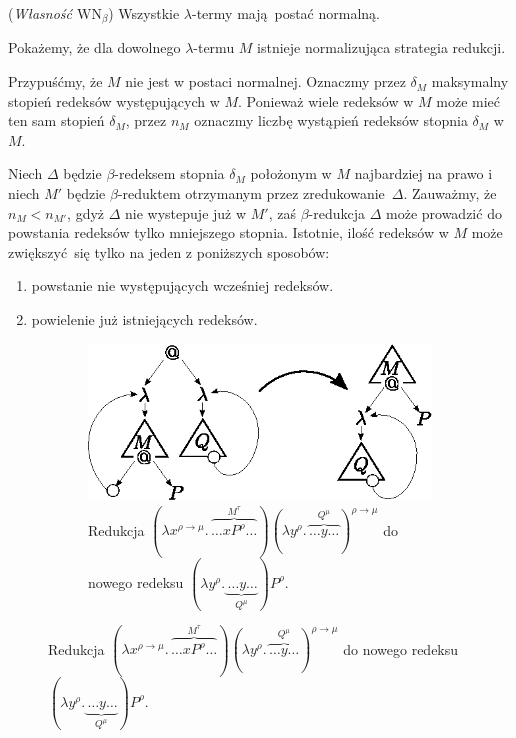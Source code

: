 \begin{twierdzenie}(\emph{Własność \(\mathrm{WN}_{\beta}\)}) Wszystkie \(\lambda\)-termy mają postać normalną.
\end{twierdzenie}
\begin{dowod}
  Pokażemy, że dla dowolnego \(\lambda\)-termu \(M\) istnieje normalizująca strategia redukcji. 

  Przypuśćmy, że \(M\) nie jest w postaci normalnej. Oznaczmy przez \(\delta_M\) maksymalny stopień redeksów występujących w \(M\). Ponieważ wiele redeksów w \(M\) może mieć ten sam stopień \(\delta_M\), przez \(n_M\) oznaczmy liczbę wystąpień redeksów stopnia \(\delta_M\) w \(M\). 

  Niech \(\Delta\) będzie \(\beta\)-redeksem stopnia \(\delta_M\) położonym w \(M\) najbardziej na prawo i niech \(M'\) będzie \(\beta\)-reduktem otrzymanym przez zredukowanie \(\Delta\). Zauważmy, że \(n_M < n_{M'}\), gdyż \(\Delta\) nie wystepuje już w \(M'\), zaś \(\beta\)-redukcja \(\Delta\) może prowadzić do powstania redeksów tylko mniejszego stopnia. Istotnie, ilość redeksów w \(M\) może zwiększyć się tylko na jeden z poniższych sposobów: 
  \begin{enumerate}[label=\roman*)]
    \item powstanie nie występujących wcześniej redeksów.
    \item powielenie już istniejących redeksów.
  \end{enumerate}

  \begin{figure}[htb]
  \centering
  \begin{subfigure}{0.55\textwidth}
    \includegraphics[width=1\linewidth]{../reduction1}
    \caption{Redukcja \((\lambda x^{\rho\to\mu}.\,\overbrace{\dots x P^\rho \dots}^{M^\tau})(\lambda y^\rho.\, \overbrace{\dots y \dots}^{Q^\mu})^{\rho\to\mu}\) do nowego redeksu \((\lambda y^\rho.\underbrace{\,\dots y\dots}_{Q^\mu})P^\rho\).}
  \end{subfigure}


\end{figure}
\end{dowod}
